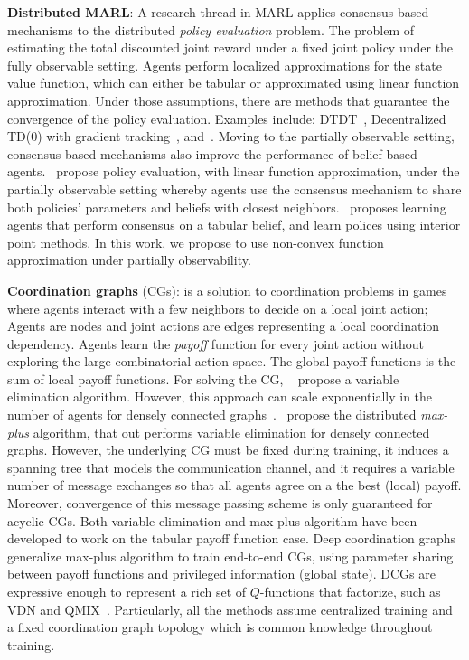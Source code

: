 \textbf{Distributed MARL}: A research thread in MARL applies consensus-based mechanisms to the distributed {\em policy evaluation} problem. The problem of estimating the total discounted joint reward under a fixed joint policy under the fully observable setting. Agents perform localized approximations for the state value function, which can either be tabular or approximated using linear function approximation. Under those assumptions, there are methods that guarantee the convergence of the policy evaluation. Examples include:  DTDT~\citep{wang_2020}, Decentralized TD(0) with gradient tracking~\citep{lin_2022},  and~\citep{sun_2020}. Moving to the partially observable setting, consensus-based mechanisms also improve the performance of belief based agents.~\citet{kayaalp_2023} propose policy evaluation, with linear function approximation, under the partially observable setting whereby agents use the consensus mechanism to share both policies' parameters and beliefs with closest neighbors.~\citet{petric_2023} proposes learning agents that perform consensus on a tabular belief, and learn polices using interior point methods. In this work, we propose to use non-convex function approximation under partially observability.

\textbf{Coordination graphs} (CGs): is  a solution to coordination problems in games where agents interact with a few neighbors to decide on a local joint action; Agents are nodes and joint actions are edges representing a local coordination dependency. Agents learn the {\em payoff} function for every joint action without exploring the large combinatorial action space. The global payoff functions is the sum of local payoff functions. For solving the CG, ~\citet{guestrin_2002} propose a variable elimination algorithm. However, this approach  can scale exponentially in the number of agents for densely connected graphs~\citep{kok_2006}.~\citet{kok_2006} propose the distributed {\em max-plus} algorithm, that out performs  variable elimination for densely connected graphs. However, the underlying CG must be fixed during training, it induces a spanning tree that models the communication channel, and it requires a variable number of message exchanges so that all agents agree on a the best (local) payoff. Moreover, convergence of this message passing scheme is only guaranteed for acyclic CGs. Both variable elimination and max-plus algorithm have been developed to work on the tabular payoff function case. Deep coordination graphs~\cite[DCGs,][]{bohmer_2020} generalize max-plus algorithm to train end-to-end CGs, using parameter sharing between payoff functions and privileged information (global state). DCGs are expressive  enough to represent a rich set of $Q$-functions that factorize, such as VDN and QMIX~\cite[QMIX,][]{rashid_2018}. Particularly, all the methods assume centralized training and a fixed coordination graph topology which is common knowledge throughout training.

